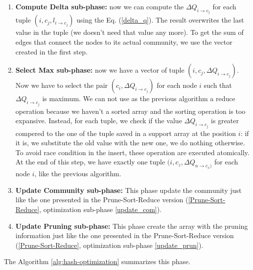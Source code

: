 \begin{enumerate}
	\item \textbf{Compute Delta sub-phase:} now we can compute the $\Delta Q_{i\rightarrow c_j}$ for each tuple $(i, c_j, l_{i \rightarrow c_j})$ using the Eq. (\ref{delta_q}). The result overwrites the last value in the tuple (we doesn't need that value any more). To get the sum of edges that connect the nodes to its actual community, we use the vector created in the first step.
	
	\item \textbf{Select Max sub-phase:} now we have a vector of tuple $(i, c_j, \Delta Q_{i\rightarrow c_j})$. Now we have to select the pair $(c_i, \Delta Q_{i\rightarrow c_j})$ for each node $i$ such that $\Delta Q_{i\rightarrow c_j}$ is maximum. We can not use as the previous algorithm a reduce operation because we haven't a sorted array and the sorting operation is too expansive. Instead, for each tuple, we check if the value $\Delta Q_{i\rightarrow c_j}$ is greater compered to the one of the tuple saved in a support array at the position $i$: if it is, we substitute the old value with the new one, we do nothing otherwise. To avoid race condition in the insert, these operation are executed atomically. At the end of this step, we have exactly one tuple $(i, c_z, \Delta Q_{n\rightarrow c_x)}$ for each node $i$, like the previous algorithm.
	
	
	\item \textbf{Update Community sub-phase:} This phase update the community just like the one presented in the Prune-Sort-Reduce version (\ref{Prune-Sort-Reduce}, optimization sub-phase \ref{update_com}).
	
	\item \textbf{Update Pruning sub-phase:} This phase create the array with the pruning information just like the one presented in the Prune-Sort-Reduce version (\ref{Prune-Sort-Reduce}, optimization sub-phase \ref{update_prun}).
\end{enumerate}
The Algorithm \ref{alg:hash-optimization} summarizes this phase.
